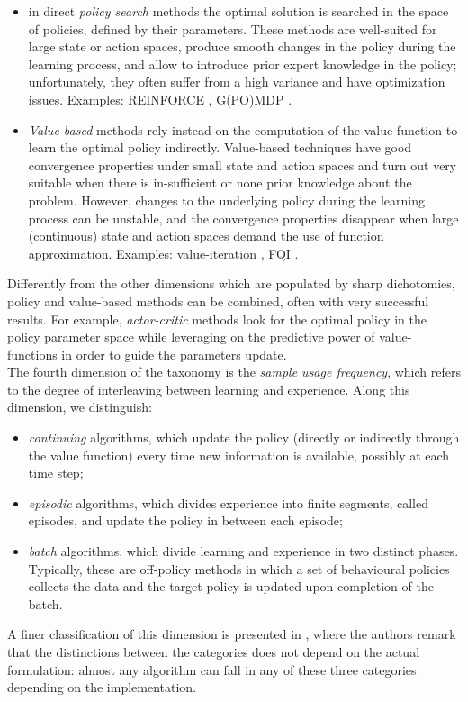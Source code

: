  \begin{itemize}
\item in direct \emph{policy search} methods the optimal solution is searched in the space of policies, defined by their parameters. These methods are well-suited for large state or action spaces,  produce smooth changes in the policy during the learning process, and allow to introduce prior expert knowledge in the policy; unfortunately, they often suffer from a high variance and have optimization issues. Examples: REINFORCE \cite{williams1992simple}, G(PO)MDP \cite{baxter2001infinite}.
\item \emph{Value-based} methods rely instead on the computation of the value function to learn the optimal policy indirectly. Value-based techniques have good convergence properties under small state and action spaces and turn out very suitable when there is in-sufficient or none prior knowledge about the problem. However, changes to the underlying policy during the learning process can be unstable, and the convergence properties disappear when large (\eg continuous) state and action spaces demand the use of function approximation. Examples: value-iteration \cite{sutton2018reinforcement}, FQI \cite{antos2008fitted}.
\end{itemize}

Differently from the other dimensions which are populated by sharp dichotomies, policy and value-based methods can be combined, often with very successful results. For example, \emph{actor-critic} methods \cite{grondman2012survey} look for the optimal policy in the policy parameter space while leveraging on the predictive power of value-functions in order to guide the parameters update. \\
The fourth dimension of the taxonomy is the \emph{sample usage frequency}, which refers to the degree of interleaving between learning and experience. Along this dimension, we distinguish:
 \begin{itemize}
\item \emph{continuing} algorithms, which update the policy (directly or indirectly through the value function) every time new information is available, possibly at each time step;
\item \emph{episodic} algorithms, which divides experience into finite segments, called episodes, and update the policy in between each episode;\item \emph{batch} algorithms, which divide learning and experience in two distinct phases. Typically, these are off-policy methods in which a set of behavioural policies collects the data and the target policy is updated upon completion of the batch.
\end{itemize}
A finer classification of this dimension is presented in \cite{lange2012batch}, where the authors remark that the distinctions between the categories does not depend on the actual formulation: almost any algorithm can fall in any of these three categories depending on the implementation.

